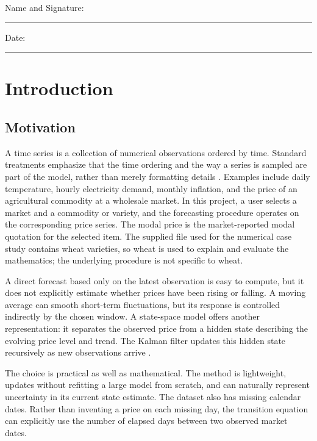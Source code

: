 \documentclass[12pt,a4paper,oneside]{report}
\numberwithin{equation}{chapter}
\numberwithin{figure}{chapter}
\numberwithin{table}{chapter}
\theoremstyle{definition}
\theoremstyle{plain}
\newcommand{\1}{\mathbf{1}}
\begin{document}
\vspace{1.2cm}
\noindent Name and Signature: \rule{7cm}{0.4pt}

\vspace{0.8cm}
\noindent Date: \rule{4cm}{0.4pt}

\clearpage
{}
\setcounter{page}{1}

\chapter{Introduction}

\section{Motivation}
A time series is a collection of numerical observations ordered by time. Standard treatments emphasize that the time ordering and the way a series is sampled are part of the model, rather than merely formatting details \cite{hamilton1994,hyndman2021}. Examples include daily temperature, hourly electricity demand, monthly inflation, and the price of an agricultural commodity at a wholesale market. In this project, a user selects a market and a commodity or variety, and the forecasting procedure operates on the corresponding price series. The modal price is the market-reported modal quotation for the selected item. The supplied file used for the numerical case study contains wheat varieties, so wheat is used to explain and evaluate the mathematics; the underlying procedure is not specific to wheat.

A direct forecast based only on the latest observation is easy to compute, but it does not explicitly estimate whether prices have been rising or falling. A moving average can smooth short-term fluctuations, but its response is controlled indirectly by the chosen window. A state-space model offers another representation: it separates the observed price from a hidden state describing the evolving price level and trend. The Kalman filter updates this hidden state recursively as new observations arrive \cite{kalman1960,welch2006,durbin2012}.

The choice is practical as well as mathematical. The method is lightweight, updates without refitting a large model from scratch, and can naturally represent uncertainty in its current state estimate. The dataset also has missing calendar dates. Rather than inventing a price on each missing day, the transition equation can explicitly use the number of elapsed days between two observed market dates.
\end{document}
